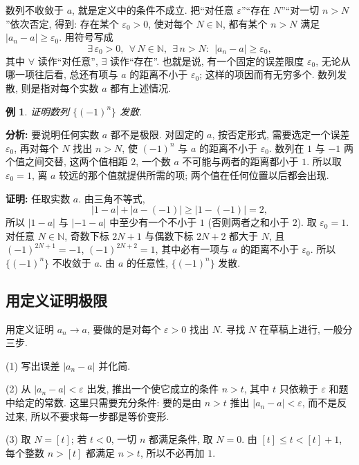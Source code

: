 \documentclass[UTF8,openany]{ctexbook}
\theoremstyle{chinesetextbook}
\newtheorem{example}{例}[section]
\newenvironment{cnproof}{\par\indent\textbf{证明:} \ignorespaces}{\par}
\begin{document}
数列不收敛于 $a$, 就是定义中的条件不成立. 把“对任意 $\varepsilon$”“存在 $N$”“对一切 $n>N$”依次否定, 得到: 存在某个 $\varepsilon_0>0$, 使对每个 $N\in\mathbb N$, 都有某个 $n>N$ 满足 $|a_n-a|\ge\varepsilon_0$. 用符号写成
\[
\exists\,\varepsilon_0>0,\ \ \forall\,N\in\mathbb N,\ \ \exists\,n>N:\ \ |a_n-a|\ge\varepsilon_0,
\]
其中 $\forall$ 读作“对任意”, $\exists$ 读作“存在”. 也就是说, 有一个固定的误差限度 $\varepsilon_0$, 无论从哪一项往后看, 总还有项与 $a$ 的距离不小于 $\varepsilon_0$; 这样的项因而有无穷多个. 数列发散, 则是指对每个实数 $a$ 都有上述情况.
\begin{example}\label{ex:12-div}
证明数列 $\{(-1)^n\}$ 发散.
\end{example}
\par\indent\textbf{分析:} 要说明任何实数 $a$ 都不是极限. 对固定的 $a$, 按否定形式, 需要选定一个误差 $\varepsilon_0$, 再对每个 $N$ 找出 $n>N$, 使 $(-1)^n$ 与 $a$ 的距离不小于 $\varepsilon_0$. 数列在 $1$ 与 $-1$ 两个值之间交替, 这两个值相距 $2$, 一个数 $a$ 不可能与两者的距离都小于 $1$. 所以取 $\varepsilon_0=1$, 离 $a$ 较远的那个值就提供所需的项; 两个值在任何位置以后都会出现.
\begin{cnproof}
任取实数 $a$. 由三角不等式,
\[
|1-a|+|a-(-1)|\ge|1-(-1)|=2,
\]
所以 $|1-a|$ 与 $|-1-a|$ 中至少有一个不小于 $1$ (否则两者之和小于 $2$). 取 $\varepsilon_0=1$. 对任意 $N\in\mathbb N$, 奇数下标 $2N+1$ 与偶数下标 $2N+2$ 都大于 $N$, 且 $(-1)^{2N+1}=-1$, $(-1)^{2N+2}=1$, 其中必有一项与 $a$ 的距离不小于 $\varepsilon_0$. 所以 $\{(-1)^n\}$ 不收敛于 $a$. 由 $a$ 的任意性, $\{(-1)^n\}$ 发散.
\end{cnproof}
\subsection{用定义证明极限}
用定义证明 $a_n\to a$, 要做的是对每个 $\varepsilon>0$ 找出 $N$. 寻找 $N$ 在草稿上进行, 一般分三步.

(1) 写出误差 $|a_n-a|$ 并化简.

(2) 从 $|a_n-a|<\varepsilon$ 出发, 推出一个使它成立的条件 $n>t$, 其中 $t$ 只依赖于 $\varepsilon$ 和题中给定的常数. 这里只需要充分条件: 要的是由 $n>t$ 推出 $|a_n-a|<\varepsilon$, 而不是反过来, 所以不要求每一步都是等价变形. 

(3) 取 $N=[t]$; 若 $t<0$, 一切 $n$ 都满足条件, 取 $N=0$. 由 $[t]\le t<[t]+1$, 每个整数 $n>[t]$ 都满足 $n>t$, 所以不必再加 $1$.
\end{document}
